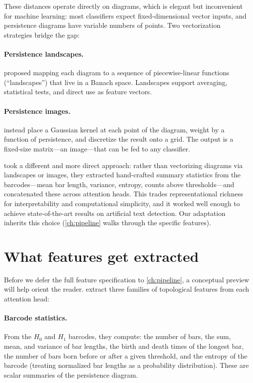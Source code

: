 These distances operate directly on diagrams, which is elegant but
inconvenient for machine learning: most classifiers expect
fixed-dimensional vector inputs, and persistence diagrams have variable
numbers of points.
Two vectorization strategies bridge the gap:

\paragraph{Persistence landscapes.}
\textcite{bubenik2015} proposed mapping each diagram to a sequence of
piecewise-linear functions (``landscapes'') that live in a Banach space.
Landscapes support averaging, statistical tests, and direct use as
feature vectors.

\paragraph{Persistence images.}
\textcite{adams2017} instead place a Gaussian kernel at each point of
the diagram, weight by a function of persistence, and discretize the
result onto a grid.
The output is a fixed-size matrix---an image---that can be fed to any
classifier.

\textcite{kushnareva2021} took a different and more direct approach:
rather than vectorizing diagrams via landscapes or images, they
extracted hand-crafted summary statistics from the barcodes---mean bar
length, variance, entropy, counts above thresholds---and concatenated
these across attention heads.
This trades representational richness for interpretability and
computational simplicity, and it worked well enough to achieve
state-of-the-art results on artificial text detection.
Our adaptation inherits this choice (\autoref{ch:pipeline} walks through
the specific features).


\section{What features get extracted}
\label{sec:features-conceptual}

Before we defer the full feature specification to \autoref{ch:pipeline},
a conceptual preview will help orient the reader.
\textcite{kushnareva2021} extract three families of topological features
from each attention head:

\paragraph{Barcode statistics.}
From the $H_0$ and $H_1$ barcodes, they compute: the number of bars,
the sum, mean, and variance of bar lengths, the birth and death times of
the longest bar, the number of bars born before or after a given
threshold, and the entropy of the barcode (treating normalized bar
lengths as a probability distribution).
These are scalar summaries of the persistence diagram.

